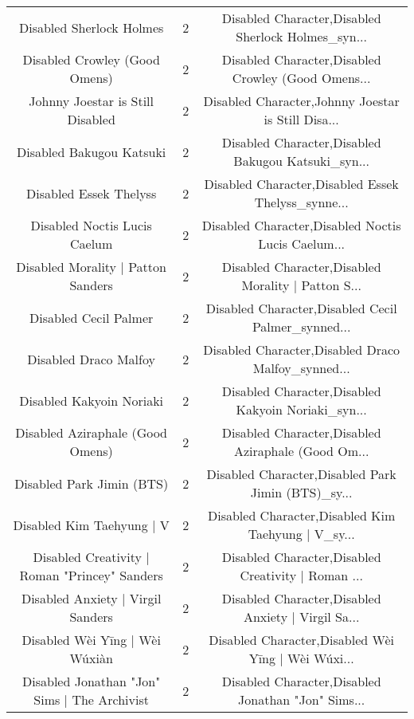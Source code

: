\begin{table}[h!]
{\begin{tabular}{|c|c|c|}
                          Disabled Sherlock Holmes &          2 & Disabled Character,Disabled Sherlock Holmes\_syn... \\
                     Disabled Crowley (Good Omens) &          2 & Disabled Character,Disabled Crowley (Good Omens... \\
                  Johnny Joestar is Still Disabled &          2 & Disabled Character,Johnny Joestar is Still Disa... \\
                          Disabled Bakugou Katsuki &          2 & Disabled Character,Disabled Bakugou Katsuki\_syn... \\
                            Disabled Essek Thelyss &          2 & Disabled Character,Disabled Essek Thelyss\_synne... \\
                      Disabled Noctis Lucis Caelum &          2 & Disabled Character,Disabled Noctis Lucis Caelum... \\
                Disabled Morality | Patton Sanders &          2 & Disabled Character,Disabled Morality | Patton S... \\
                             Disabled Cecil Palmer &          2 & Disabled Character,Disabled Cecil Palmer\_synned... \\
                             Disabled Draco Malfoy &          2 & Disabled Character,Disabled Draco Malfoy\_synned... \\
                          Disabled Kakyoin Noriaki &          2 & Disabled Character,Disabled Kakyoin Noriaki\_syn... \\
                  Disabled Aziraphale (Good Omens) &          2 & Disabled Character,Disabled Aziraphale (Good Om... \\
                         Disabled Park Jimin (BTS) &          2 & Disabled Character,Disabled Park Jimin (BTS)\_sy... \\
                         Disabled Kim Taehyung | V &          2 & Disabled Character,Disabled Kim Taehyung | V\_sy... \\
     Disabled Creativity | Roman "Princey" Sanders &          2 & Disabled Character,Disabled Creativity | Roman ... \\
                 Disabled Anxiety | Virgil Sanders &          2 & Disabled Character,Disabled Anxiety | Virgil Sa... \\
                    Disabled Wèi Yīng | Wèi Wúxiàn &          2 & Disabled Character,Disabled Wèi Yīng | Wèi Wúxi... \\
      Disabled Jonathan "Jon" Sims | The Archivist &          2 & Disabled Character,Disabled Jonathan "Jon" Sims... \\

\end{tabular}}
\end{table}
